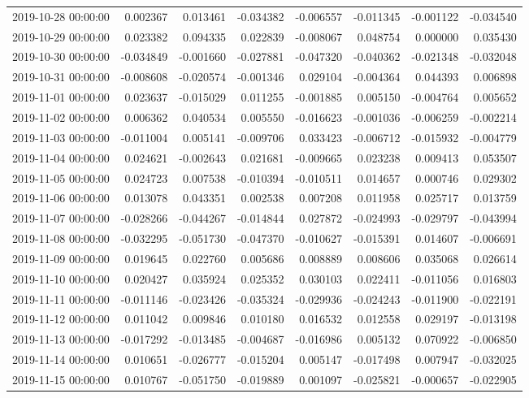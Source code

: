 \begin{tabular}{lrrrrrrr}
2019-10-28 00:00:00 & 0.002367 & 0.013461 & -0.034382 & -0.006557 & -0.011345 & -0.001122 & -0.034540 \\
2019-10-29 00:00:00 & 0.023382 & 0.094335 & 0.022839 & -0.008067 & 0.048754 & 0.000000 & 0.035430 \\
2019-10-30 00:00:00 & -0.034849 & -0.001660 & -0.027881 & -0.047320 & -0.040362 & -0.021348 & -0.032048 \\
2019-10-31 00:00:00 & -0.008608 & -0.020574 & -0.001346 & 0.029104 & -0.004364 & 0.044393 & 0.006898 \\
2019-11-01 00:00:00 & 0.023637 & -0.015029 & 0.011255 & -0.001885 & 0.005150 & -0.004764 & 0.005652 \\
2019-11-02 00:00:00 & 0.006362 & 0.040534 & 0.005550 & -0.016623 & -0.001036 & -0.006259 & -0.002214 \\
2019-11-03 00:00:00 & -0.011004 & 0.005141 & -0.009706 & 0.033423 & -0.006712 & -0.015932 & -0.004779 \\
2019-11-04 00:00:00 & 0.024621 & -0.002643 & 0.021681 & -0.009665 & 0.023238 & 0.009413 & 0.053507 \\
2019-11-05 00:00:00 & 0.024723 & 0.007538 & -0.010394 & -0.010511 & 0.014657 & 0.000746 & 0.029302 \\
2019-11-06 00:00:00 & 0.013078 & 0.043351 & 0.002538 & 0.007208 & 0.011958 & 0.025717 & 0.013759 \\
2019-11-07 00:00:00 & -0.028266 & -0.044267 & -0.014844 & 0.027872 & -0.024993 & -0.029797 & -0.043994 \\
2019-11-08 00:00:00 & -0.032295 & -0.051730 & -0.047370 & -0.010627 & -0.015391 & 0.014607 & -0.006691 \\
2019-11-09 00:00:00 & 0.019645 & 0.022760 & 0.005686 & 0.008889 & 0.008606 & 0.035068 & 0.026614 \\
2019-11-10 00:00:00 & 0.020427 & 0.035924 & 0.025352 & 0.030103 & 0.022411 & -0.011056 & 0.016803 \\
2019-11-11 00:00:00 & -0.011146 & -0.023426 & -0.035324 & -0.029936 & -0.024243 & -0.011900 & -0.022191 \\
2019-11-12 00:00:00 & 0.011042 & 0.009846 & 0.010180 & 0.016532 & 0.012558 & 0.029197 & -0.013198 \\
2019-11-13 00:00:00 & -0.017292 & -0.013485 & -0.004687 & -0.016986 & 0.005132 & 0.070922 & -0.006850 \\
2019-11-14 00:00:00 & 0.010651 & -0.026777 & -0.015204 & 0.005147 & -0.017498 & 0.007947 & -0.032025 \\
2019-11-15 00:00:00 & 0.010767 & -0.051750 & -0.019889 & 0.001097 & -0.025821 & -0.000657 & -0.022905 \\

\end{tabular}
